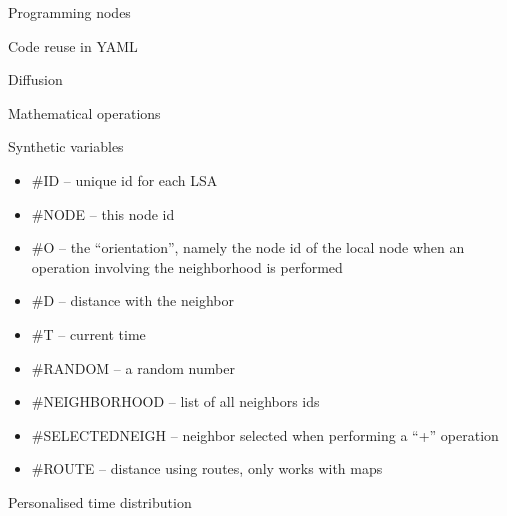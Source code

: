 \documentclass[presentation]{beamer}
\begin{document}
\begin{frame}[fragile]{Programming nodes}
\end{frame}

\begin{frame}[fragile]{Code reuse in YAML}
\end{frame}

\begin{frame}[fragile]{Diffusion}
\end{frame}

\begin{frame}[fragile]{Mathematical operations}
\end{frame}

\begin{frame}[fragile]{Synthetic variables}
\begin{itemize}
 \item \#ID -- unique id for each LSA
 \item \#NODE -- this node id
 \item \#O -- the ``orientation'', namely the node id of the local node when an operation involving the neighborhood is performed
 \item \#D -- distance with the neighbor
 \item \#T -- current time
 \item \#RANDOM -- a random number
 \item \#NEIGHBORHOOD -- list of all neighbors ids
 \item \#SELECTEDNEIGH -- neighbor selected when performing a ``+'' operation
 \item \#ROUTE -- distance using routes, only works with maps
\end{itemize}
\end{frame}

\begin{frame}[fragile]{Personalised time distribution}
\end{frame}
\end{document}
